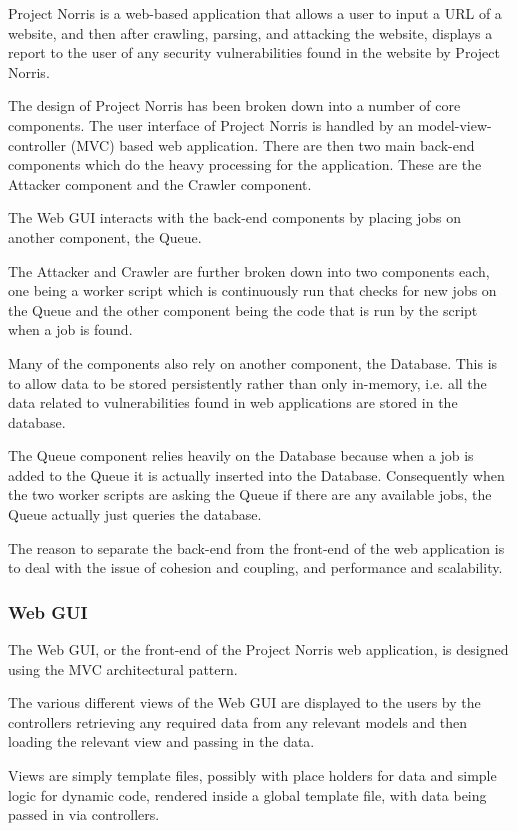 \documentclass[12pt,a4paper]{article}
\begin{document}
Project Norris is a web-based application that allows a user to input a URL of a website, and then after crawling, parsing, and attacking the website, displays a report to the user of any security vulnerabilities found in the website by Project Norris.

The design of Project Norris has been broken down into a number of core components.  The user interface of Project Norris is handled by an model-view-controller (MVC) based web application.  There are then two main back-end components which do the heavy processing for the application.  These are the Attacker component and the Crawler component.

The Web GUI interacts with the back-end components by placing jobs on another component, the Queue.

The Attacker and Crawler are further broken down into two components each, one being a worker script which is continuously run that checks for new jobs on the Queue and the other component being the code that is run by the script when a job is found.

Many of the components also rely on another component, the Database. This is to allow data to be stored persistently rather than only in-memory, i.e. all the data related to vulnerabilities found in web applications are stored in the database.

The Queue component relies heavily on the Database because when a job is added to the Queue it is actually inserted into the Database.  Consequently when the two worker scripts are asking the Queue if there are any available jobs, the Queue actually just queries the database.

The reason to separate the back-end from the front-end of the web application is to deal with the issue of cohesion and coupling, and performance and scalability.  %

\subsubsection{Web GUI}
The Web GUI, or the front-end of the Project Norris web application, is designed using the MVC architectural pattern.

The various different views of the Web GUI are displayed to the users by the controllers retrieving any required data from any relevant models and then loading the relevant view and passing in the data.

Views are simply template files, possibly with place holders for data and simple logic for dynamic code, rendered inside a global template file, with data being passed in via controllers.
\end{document}
